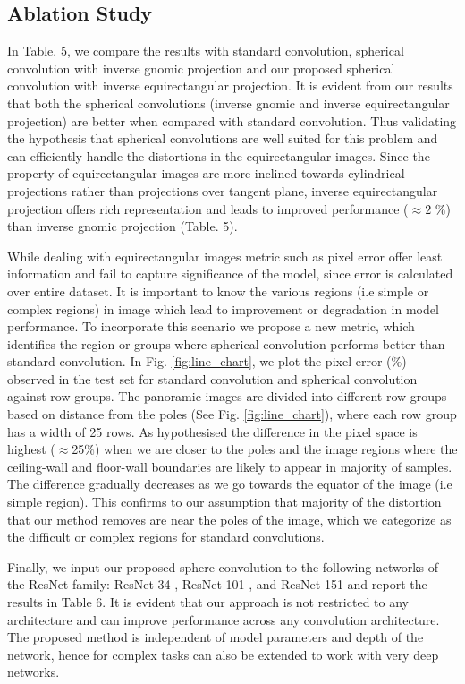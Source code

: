 \documentclass[final]{cvpr}
\begin{document}
\subsection{Ablation Study}\label{subsec:ablation}
In Table. 5, we compare the results with standard convolution, spherical convolution with inverse gnomic projection \cite{coors2018spherenet} and our proposed spherical convolution with inverse equirectangular projection. It is evident from our results that both the spherical convolutions (inverse gnomic and inverse equirectangular projection) are better when compared with standard convolution. Thus validating the hypothesis that spherical convolutions are well suited for this problem and can efficiently handle the distortions in the equirectangular images. Since the property of equirectangular images are more inclined towards cylindrical projections rather than projections over tangent plane, inverse equirectangular projection offers rich representation and leads to improved performance ($\approx 2$ $\%$) than inverse gnomic projection (Table. 5).

While dealing with equirectangular images metric such as pixel error offer least information and fail to capture significance of the model, since error is calculated over entire dataset. It is important to know the various regions (i.e simple or complex regions) in image which lead to improvement or degradation in model performance. To incorporate this scenario we propose a new metric, which identifies the region or groups where spherical convolution performs better than standard convolution. In Fig. \ref{fig:line_chart}, we plot the pixel error ($\%$) observed in the test set for standard convolution and spherical convolution against row groups. The panoramic images are divided into different row groups based on distance from the poles (See Fig. \ref{fig:line_chart}), where each row group has a width of 25 rows.
As hypothesised the difference in the pixel space is highest ($\approx$25$\%$) when we are closer to the poles and the image regions where the ceiling-wall and floor-wall boundaries are likely to appear in majority of samples. The difference gradually decreases as we go towards the equator of the image (i.e simple region). This confirms to our assumption that majority of the distortion that our method removes are near the poles of the image, which we categorize as the difficult or complex regions for standard convolutions.



Finally, we input our proposed sphere convolution to the following networks of the ResNet family: ResNet-34 \cite{he2016deep}, ResNet-101 \cite{he2016deep}, and ResNet-151 \cite{he2016deep} and report the results in Table 6. It is evident that our approach is not restricted to any architecture and can improve performance across any convolution architecture. The proposed method is independent of model parameters and depth of the network, hence for complex tasks can also be extended to work with very deep networks.
\end{document}
